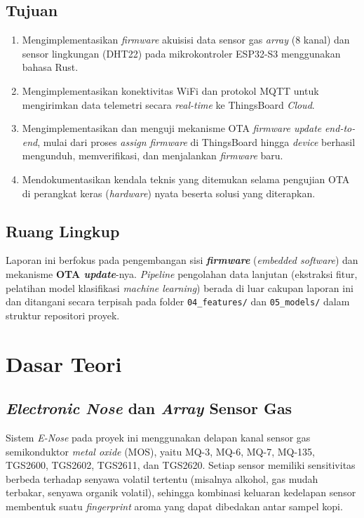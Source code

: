 \documentclass[12pt,a4paper]{report}
\begin{document}
\section{Tujuan}
\begin{enumerate}[label=\arabic*.]
    \item Mengimplementasikan \textit{firmware} akuisisi data sensor gas \textit{array} (8 kanal) dan
    sensor lingkungan (DHT22) pada mikrokontroler ESP32-S3 menggunakan bahasa Rust.
    \item Mengimplementasikan konektivitas WiFi dan protokol MQTT untuk mengirimkan data
    telemetri secara \textit{real-time} ke ThingsBoard \textit{Cloud}.
    \item Mengimplementasikan dan menguji mekanisme OTA \textit{firmware update} \textit{end-to-end},
    mulai dari proses \textit{assign firmware} di ThingsBoard hingga \textit{device} berhasil
    mengunduh, memverifikasi, dan menjalankan \textit{firmware} baru.
    \item Mendokumentasikan kendala teknis yang ditemukan selama pengujian OTA di
    perangkat keras (\textit{hardware}) nyata beserta solusi yang diterapkan.
\end{enumerate}

\section{Ruang Lingkup}
Laporan ini berfokus pada pengembangan sisi \textbf{\textit{firmware}} (\textit{embedded software}) dan
mekanisme \textbf{OTA \textit{update}}-nya. \textit{Pipeline} pengolahan data lanjutan (ekstraksi fitur,
pelatihan model klasifikasi \textit{machine learning}) berada di luar cakupan laporan ini dan
ditangani secara terpisah pada folder \texttt{04\_features/} dan \texttt{05\_models/}
dalam struktur repositori proyek.

\chapter{Dasar Teori}

\section{\textit{Electronic Nose} dan \textit{Array} Sensor Gas}
Sistem \textit{E-Nose} pada proyek ini menggunakan delapan kanal sensor gas semikonduktor \textit{metal oxide}
(MOS), yaitu MQ-3, MQ-6, MQ-7, MQ-135, TGS2600, TGS2602, TGS2611, dan TGS2620.
Setiap sensor memiliki sensitivitas berbeda terhadap senyawa volatil tertentu (misalnya
alkohol, gas mudah terbakar, senyawa organik volatil), sehingga kombinasi keluaran
kedelapan sensor membentuk suatu \textit{fingerprint} aroma yang dapat dibedakan antar
sampel kopi.
\end{document}
